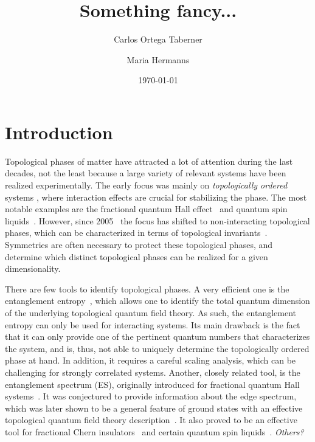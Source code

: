 \documentclass[twocolumn,amsmath,longbibliography,amssymb,superscriptaddress]{revtex4-1}
\newcommand{\mariac}[1]{{\it\color{cyan}#1}}
\begin{document}
		
\title{Something fancy...}
\author{Carlos Ortega Taberner}

\author{Maria Hermanns}
\date{\today}
		
\maketitle
	


\section{Introduction}
Topological phases of matter have attracted a lot of attention during the last decades, not the least because a large variety of relevant systems have been realized experimentally. 
The early focus was mainly on \emph{topologically ordered} systems \cite{wenbook}, where interaction effects are crucial for stabilizing the phase. 
The most notable examples are the fractional quantum Hall effect~\cite{Tsui1982} and quantum spin liquids~\cite{Balents2010spin}. 
However, since 2005~\cite{kane2005quantum, roy2009topological} the focus has shifted to non-interacting topological phases, which can be characterized in terms of topological invariants~\cite{ryu2010topological}. 
Symmetries are often necessary to protect these topological phases, and determine which distinct topological phases can be realized for a given dimensionality. 

There are few tools to identify topological phases. 
A very efficient one is the entanglement entropy~\cite{Kitaev2006topological, Levin2006detecting}, which allows one to identify the total quantum dimension of the underlying topological quantum field theory. 
As such, the entanglement entropy can only be used for interacting systems. 
Its main drawback is the fact that it can only provide one of the pertinent quantum numbers that characterizes the system, and is, thus,  not able to uniquely determine the topologically ordered phase at hand. 
In addition, it requires a careful scaling analysis, which can be challenging for strongly correlated systems. 
Another, closely related tool, is the entanglement spectrum (ES), originally introduced for fractional quantum Hall systems~\cite{Li2008entanglement}. 
It was conjectured to provide information about the edge spectrum, which was later shown to be a general feature of ground states with an effective topological quantum field theory description~\cite{Qi2012general}. 
It also proved to be an effective tool for fractional Chern insulators~\cite{Regnault2011fractional} and certain quantum spin liquids~\cite{yao2010entanglement}. \mariac{Others?}
\end{document}
